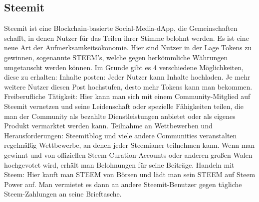 \subsection{Steemit}
Steemit ist eine Blockchain-basierte Social-Media-dApp, die Gemeinschaften schafft, in denen Nutzer für das Teilen ihrer Stimme belohnt werden. Es ist eine neue Art der Aufmerksamkeitsökonomie. 
Hier sind Nutzer in der Lage Tokens zu gewinnen, sogenannte STEEM’s, welche gegen herkömmliche Währungen umgetauscht werden können. Im Grunde gibt es 4 verschiedene Möglichkeiten, diese zu erhalten: 
Inhalte posten: Jeder Nutzer kann Inhalte hochladen. Je mehr weitere Nutzer diesen Post hochstufen, desto mehr Tokens kann man bekommen.
Freiberufliche Tätigkeit: Hier kann man sich mit einem Community-Mitglied auf Steemit vernetzen und seine Leidenschaft oder spezielle Fähigkeiten teilen, die man der Community als bezahlte Dienstleistungen anbietet oder als eigenes Produkt vermarktet werden kann.
Teilnahme an Wettbewerben und Herausforderungen: Steemitblog und viele andere Communities veranstalten regelmäßig Wettbewerbe, an denen jeder Steemianer teilnehmen kann. Wenn man gewinnt und von offiziellen Steem-Curation-Accounts oder anderen großen Walen hochgevotet wird, erhält man Belohnungen für seine Beiträge.
Handeln mit Steem: Hier kauft man STEEM von Börsen und lädt man sein STEEM auf Steem Power auf. Man vermietet es dann an andere Steemit-Benutzer gegen tägliche Steem-Zahlungen an seine Brieftasche.